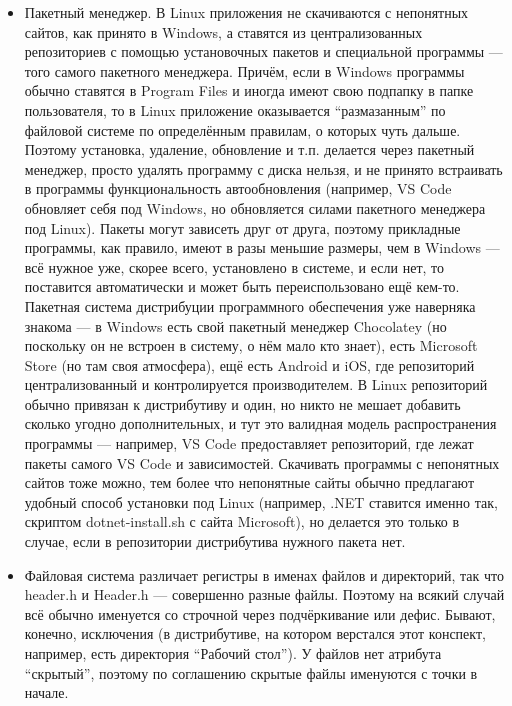 \documentclass{../../text-style}
\begin{document}
\begin{itemize}
    \item Пакетный менеджер.
        В Linux приложения не скачиваются с непонятных сайтов, как принято в Windows, а ставятся из централизованных репозиториев с помощью установочных пакетов и специальной программы --- того самого пакетного менеджера.
        Причём, если в Windows программы обычно ставятся в Program Files и иногда имеют свою подпапку в папке пользователя, то в Linux приложение оказывается \enquote{размазанным} по файловой системе по определённым правилам, о которых чуть дальше.
        Поэтому установка, удаление, обновление и т.п. делается через пакетный менеджер, просто удалять программу с диска нельзя, и не принято встраивать в программы функциональность автообновления (например, VS Code обновляет себя под Windows, но обновляется силами пакетного менеджера под Linux).
        Пакеты могут зависеть друг от друга, поэтому прикладные программы, как правило, имеют в разы меньшие размеры, чем в Windows --- всё нужное уже, скорее всего, установлено в системе, и если нет, то поставится автоматически и может быть переиспользовано ещё кем-то.
        Пакетная система дистрибуции программного обеспечения уже наверняка знакома --- в Windows есть свой пакетный менеджер Chocolatey (но поскольку он не встроен в систему, о нём мало кто знает), есть Microsoft Store (но там своя атмосфера), ещё есть Android и iOS, где репозиторий централизованный и контролируется производителем.
        В Linux репозиторий обычно привязан к дистрибутиву и один, но никто не мешает добавить сколько угодно дополнительных, и тут это валидная модель распространения программы --- например, VS Code предоставляет репозиторий, где лежат пакеты самого VS Code и зависимостей.
        Скачивать программы с непонятных сайтов тоже можно, тем более что непонятные сайты обычно предлагают удобный способ установки под Linux (например, .NET ставится именно так, скриптом dotnet-install.sh с сайта Microsoft), но делается это только в случае, если в репозитории дистрибутива нужного пакета нет.
    \item Файловая система различает регистры в именах файлов и директорий, так что header.h и Header.h --- совершенно разные файлы.
        Поэтому на всякий случай всё обычно именуется со строчной через подчёркивание или дефис.
        Бывают, конечно, исключения (в дистрибутиве, на котором верстался этот конспект, например, есть директория \enquote{Рабочий стол}).
        У файлов нет атрибута \enquote{скрытый}, поэтому по соглашению скрытые файлы именуются с точки в начале.

\end{itemize}
\end{document}
